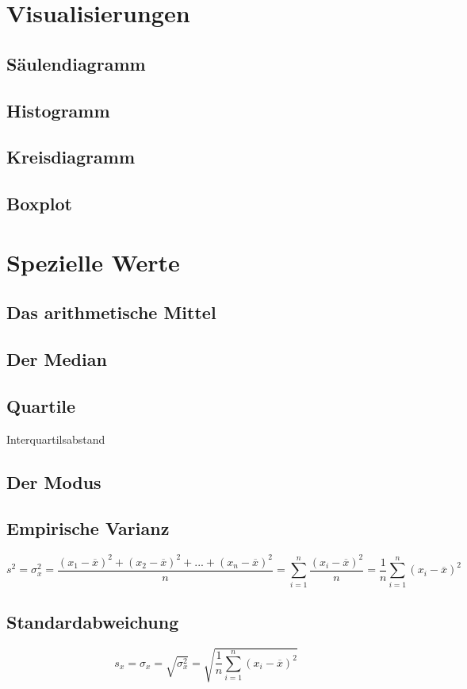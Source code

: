 \documentclass[12pt,a4paper]{scrbook}
\begin{document}
\section{Visualisierungen}
\subsection{Säulendiagramm}
\subsection{Histogramm}
\subsection{Kreisdiagramm}
\subsection{Boxplot}

\section{Spezielle Werte}
\subsection{Das arithmetische Mittel}
\subsection{Der Median}
\subsection{Quartile}
Interquartilsabstand

\subsection{Der Modus}
\subsection{Empirische Varianz}
\[ s^2 = \sigma^2_x = \frac{(x_1-\overline{x})^2 + (x_2-\overline{x})^2 + ... + (x_n-\overline{x})^2}{n} = \sum_{i=1}^n \frac{(x_i-\overline{x})^2}{n} = \frac{1}{n}\sum_{i=1}^n (x_i-\overline{x})^2\]

\subsection{Standardabweichung}
\[ s_x = \sigma_x = \sqrt{\sigma^2_x} = \sqrt{\frac{1}{n} \sum_{i=1}^n (x_i-\overline{x})^2} \]
\end{document}
